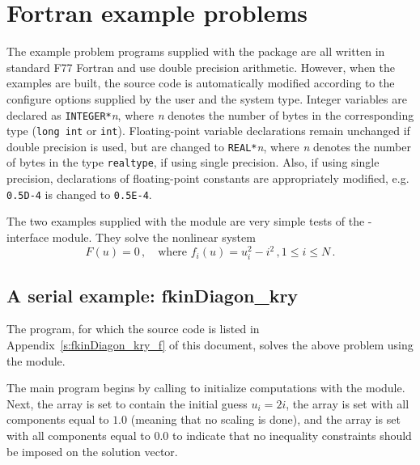\section{Fortran example problems}\label{s:ex_fortran}

The {\F} example problem programs supplied with the {\kinsol}
package are all written in standard F77 Fortran and use double precision
arithmetic. However, when the {\F} examples are built, the source code is
automatically modified according to the configure options supplied by the
user and the system type. Integer variables are declared as {\tt INTEGER*}{\em n},
where {\em n} denotes the number of bytes in the corresponding {\C} type
({\tt long int} or {\tt int}). Floating-point variable declarations remain
unchanged if double precision is used, but are changed to {\tt REAL*}{\em n},
where {\em n} denotes the number of bytes in the {\sundials} type {\tt realtype},
if using single precision. Also, if using single precision, declarations of
floating-point constants are appropriately modified, e.g. {\tt 0.5D-4} is
changed to {\tt 0.5E-4}.


The two examples supplied with the {\fkinsol} module are very simple tests 
of the {\F}-{\C} interface module. 
They solve the nonlinear system
\begin{equation*}
  F(u) = 0 \, , \quad \text{where } f_i(u) = u_i^2 - i^2 \, , 1 \le i \le N \, . 
\end{equation*}

\subsection{A serial example: fkinDiagon\_kry}\label{ss:fkinDiagon_kry}

The  program, for which the source code is listed
in Appendix~\ref{s:fkinDiagon_kry_f} of this document, solves the
above problem using the {\nvecs} module.

The main program begins by calling  to initialize computations
with the {\nvecs} module. Next, the array  is set to contain
the initial guess $u_i = 2 i$, the array  is set with all 
components equal to $1.0$ (meaning that no scaling is done), and the array
 is set with all components equal to $0.0$ to indicate that no 
inequality constraints should be imposed on the solution vector.

